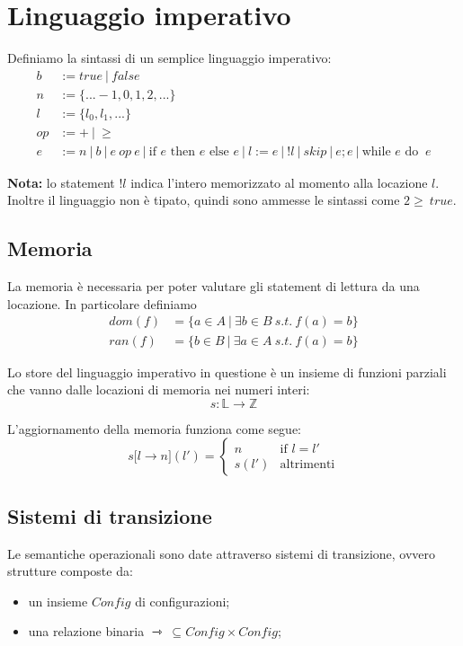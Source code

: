 \documentclass[a4paper, 11pt]{article}
\begin{document}
\newpage
\section{Linguaggio imperativo} \label{imp}
Definiamo la sintassi di un semplice linguaggio imperativo:
\begin{align*}
	b &:= true\ |\ false \\
	n &:= \lbrace ... -1, 0, 1, 2, ...\rbrace\\
	l &:= \lbrace l_0, l_1, ... \rbrace \\
	op &:= +\ |\ \geq \\
	e &:= n\ |\ b\ |\ e\ op\ e\ |\ \text{if } e \text{ then } e \text{ else } e\ |\ l:=e\ |\ !l\ |\ skip\ |\ e;e\ |\ \text{while } e \text{ do }\ e
\end{align*}

\textbf{Nota:} lo statement $!l$ indica l'intero memorizzato al momento alla locazione $l$. Inoltre il linguaggio non è tipato, quindi sono ammesse le sintassi come $2 \geq\ true$.

\subsection{Memoria}
La memoria è necessaria per poter valutare gli statement di lettura da una locazione. In particolare definiamo \begin{align*}
 dom(f) &= \lbrace a \in A\ |\ \exists b \in B\ s.t.\ f(a)=b \rbrace  \\
 ran(f) &= \lbrace b \in B\ |\ \exists a \in A\ s.t.\ f(a)=b \rbrace
 \end{align*}
 
 Lo store del linguaggio imperativo in questione è un insieme di funzioni parziali che vanno dalle locazioni di memoria nei numeri interi: \[ s: \mathbb{L} \to \mathbb{Z} \]
 
 L'aggiornamento della memoria funziona come segue: \[ s \lbrack l \rightarrow n \rbrack (l') = \begin{cases}
 n &\text{if } l=l' \\
 s(l') &\text{altrimenti}
 \end{cases} \]
 
 \subsection{Sistemi di transizione}
 Le semantiche operazionali sono date attraverso sistemi di transizione, ovvero strutture composte da: \begin{itemize}
 	\item un insieme $Config$ di configurazioni;
 	\item una relazione binaria $\rightarrowtriangle\ \subseteq Config \times Config$;
 \end{itemize}
\end{document}
